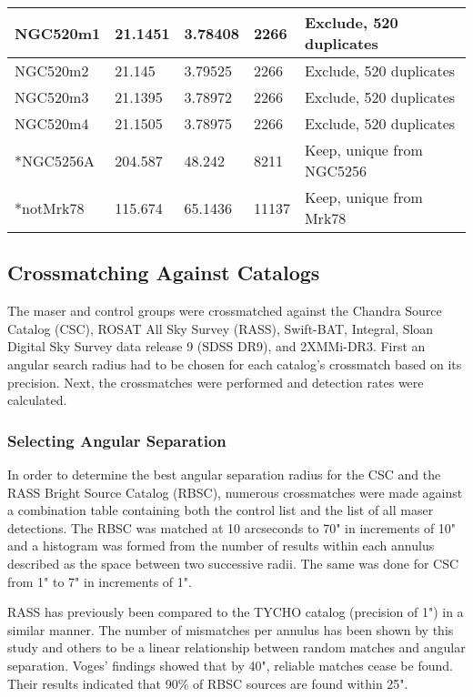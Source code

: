 \documentclass[10pt]{article}
\begin{document}
\begin {table}
\begin{center}
{\begin{tabular} {|p{4cm}|p{1.2cm}|p{1.2cm}|p{0.8cm}|p{6.7cm}|}
NGC520m1 & 21.1451 & 3.78408 & 2266 & Exclude, 520 duplicates \\ \hline
NGC520m2 & 21.145 & 3.79525 & 2266 & Exclude, 520 duplicates \\ \hline
NGC520m3 & 21.1395 & 3.78972 & 2266 & Exclude, 520 duplicates \\ \hline
NGC520m4 & 21.1505 & 3.78975 & 2266 & Exclude, 520 duplicates \\ \hline
*NGC5256A & 204.587 & 48.242 & 8211 & Keep, unique from NGC5256 \\ \hline
*notMrk78 & 115.674 & 65.1436 & 11137 & Keep, unique from Mrk78 \\
  \hline
\end{tabular}}
\end{center}
\end {table}
\begin{multicols}{2}

\subsection{Crossmatching Against Catalogs}\label{match}
The maser and control groups were crossmatched against the Chandra Source Catalog (CSC), ROSAT All Sky Survey (RASS), Swift-BAT, Integral, Sloan Digital Sky Survey data release 9 (SDSS DR9), and 2XMMi-DR3. First an angular search radius had to be chosen for each catalog's crossmatch based on its precision. Next, the crossmatches were performed and detection rates were calculated.
\subsubsection{Selecting Angular Separation}\label{angle}
In order to determine the best angular separation radius for the CSC and the RASS Bright Source Catalog (RBSC), numerous crossmatches were made against a combination table containing both the control list and the list of all maser detections. The RBSC was matched at 10 arcseconds to 70" in increments of 10" and a histogram was formed from the number of results within each annulus described as the space between two successive radii. The same was done for CSC from 1" to 7" in increments of 1".

RASS has previously been compared to the TYCHO catalog (precision of 1") in a similar manner\cite{voges}. The number of mismatches per annulus has been shown by this study and others\cite{parejko} to be a linear relationship between random matches and angular separation. Voges' findings showed that by 40", reliable matches cease be found. Their results indicated that 90\% of RBSC sources are found within 25".


\end{multicols}
\end{document}
